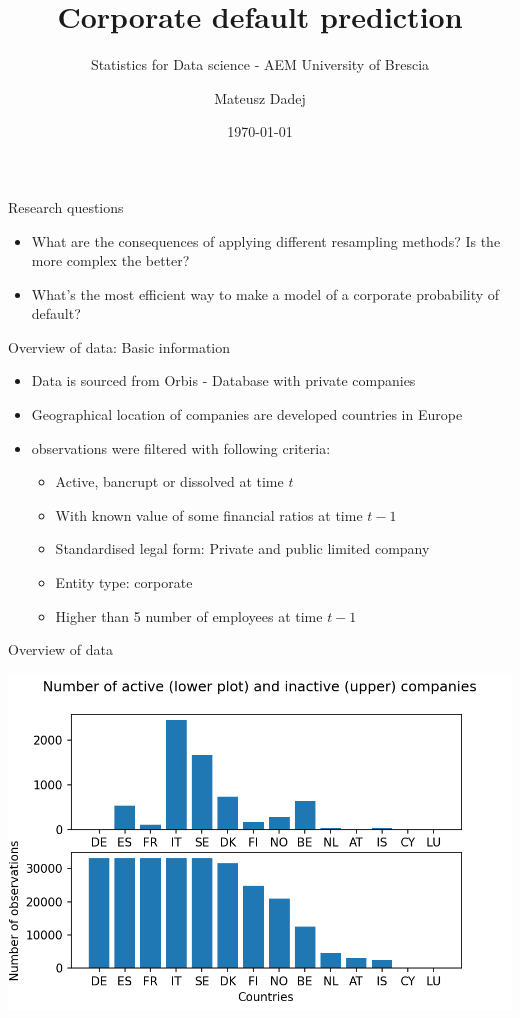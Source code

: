 \documentclass{beamer}
\title{Corporate default prediction}
\subtitle{Statistics for Data science - AEM University of Brescia}
\author{Mateusz Dadej}
\date{\today}
\begin{document}
\begin{frame}
\titlepage
\end{frame}

\begin{frame}{Research questions}
\begin{itemize}
\item What are the consequences of applying different resampling methods? Is the more complex the better?
\item What's the most efficient way to make a model of a corporate probability of default?
\end{itemize}
\end{frame}

\begin{frame}{Overview of data: Basic information}

\begin{itemize}
\item Data is sourced from Orbis - Database with private companies
\item Geographical location of companies are developed countries in Europe 
\item observations were filtered with following criteria:
	\begin{itemize}
	\item Active, bancrupt or dissolved at time $t$
	\item With known value of some financial ratios at time $t-1$
	\item Standardised legal form: Private and public limited company
	\item Entity type: corporate
	\item Higher than 5 number of employees at time $t-1$
	\end{itemize}

\end{itemize}

\end{frame}

\begin{frame}{Overview of data}
\begin{center}
\includegraphics[scale=0.7]{img/country_n.png}
\end{center}
\end{frame}
\end{document}
